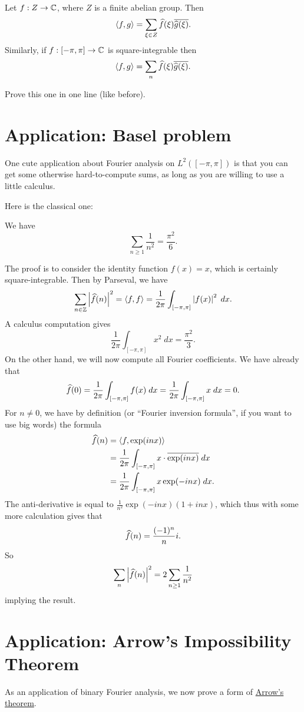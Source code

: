\begin{corollary}
	Let $f : Z \to \mathbb C$, where $Z$ is a finite abelian group.
	Then \[ \left< f,g \right> = \sum_{\xi \in Z} \widehat f(\xi) \overline{\widehat g(\xi)}. \]
	Similarly, if $f : [-\pi, \pi] \to \mathbb C$ is square-integrable then
	\[ \left< f,g \right> = \sum_n \widehat f(\xi) \overline{\widehat g(\xi)}. \]
\end{corollary}
\begin{ques}
	Prove this one in one line (like before).
\end{ques}

\section{Application: Basel problem}
One cute application about Fourier analysis on $L^2([-\pi, \pi])$
is that you can get some otherwise hard-to-compute sums,
as long as you are willing to use a little calculus.

Here is the classical one:
\begin{theorem}
	We have
	\[ \sum_{n \ge 1} \frac{1}{n^2} = \frac{\pi^2}{6}. \]
\end{theorem}
The proof is to consider the identity function $f(x) = x$,
which is certainly square-integrable.
Then by Parseval, we have
\[
	\sum_{n \in \mathbb Z} \left\lvert \widehat f(n) \right\rvert^2
	= \left< f,f\right>
	= \frac{1}{2\pi} \int_{[-\pi, \pi]} \left\lvert f(x) \right\rvert^2 \; dx.
\]
A calculus computation gives
\[  \frac{1}{2\pi} \int_{[-\pi, \pi]} x^2 \; dx = \frac{\pi^2}{3}. \]
On the other hand, we will now compute all Fourier coefficients.
We have already that
\[ \widehat f(0) = \frac{1}{2\pi} \int_{[-\pi, \pi]} f(x) \; dx 
	= \frac{1}{2\pi} \int_{[-\pi, \pi]} x \; dx = 0. \]
For $n \neq 0$, we have by definition
(or ``Fourier inversion formula'', if you want to use big words)
the formula
\begin{align*}
	\widehat f(n) &= \left< f, \exp(inx) \right> \\
	&= \frac{1}{2\pi} \int_{[-\pi, \pi]} x \cdot \overline{\exp(inx)} \; dx \\
	&= \frac{1}{2\pi} \int_{[-\pi, \pi]} x \exp(-inx) \; dx.
\end{align*}
The anti-derivative is equal to
$\frac{1}{n^2} \exp(-inx) (1+inx)$,
which thus with some more calculation gives that
\[ \widehat f(n) = \frac{(-1)^n}{n} i. \]
So
\[ \sum_n \left\lvert \widehat f(n) \right\rvert^2
	= 2 \sum_{n \ge 1} \frac{1}{n^2} \]
implying the result.

\section{Application: Arrow's Impossibility Theorem}
As an application of binary Fourier analysis,
we now prove a form of
\href{https://en.wikipedia.org/wiki/Arrow's_impossibility_theorem}{Arrow's theorem}.

